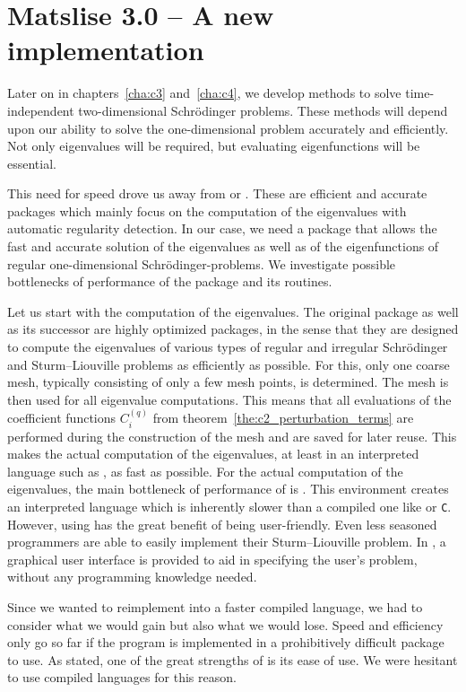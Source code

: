 \section{Matslise 3.0 -- A new implementation}\label{sec:c2_the_implementation}

Later on in chapters~\ref{cha:c3} and~\ref{cha:c4}, we develop methods to solve time-independent two-dimensional Schrödinger problems. These methods will depend upon our ability to solve the one-dimensional problem accurately and efficiently. Not only eigenvalues will be required, but evaluating eigenfunctions will be essential.

This need for speed drove us away from \matslise{} or . These are efficient and accurate packages which mainly focus on the computation of the eigenvalues with automatic regularity detection. In our case, we need a package that allows the fast and accurate solution of the eigenvalues as well as of the eigenfunctions of regular one-dimensional Schrödinger-problems. We investigate possible bottlenecks of performance of the  package and its routines.

Let us start with the computation of the eigenvalues. The original \matslise{} package as well as its successor  are highly optimized packages, in the sense that they are designed to compute the eigenvalues of various types of regular and irregular Schrödinger and Sturm--Liouville problems as efficiently as possible. For this, only one coarse mesh, typically consisting of only a few mesh points, is determined. The mesh is then used for all eigenvalue computations. This means that all evaluations of the coefficient functions $C_i^{(q)}$ from theorem~\ref{the:c2_perturbation_terms} are performed during the construction of the mesh and are saved for later reuse. This makes the actual computation of the eigenvalues, at least in an interpreted language such as \matlab{}, as fast as possible. For the actual computation of the eigenvalues, the main bottleneck of performance of  is \matlab{}. This environment creates an interpreted language which is inherently slower than a compiled one like \fortran{} or \texttt{C}. However, using \matlab{} has the great benefit of being user-friendly. Even less seasoned programmers are able to easily implement their Sturm--Liouville problem. In , a graphical user interface is provided to aid in specifying the user's problem, without any programming knowledge needed.

Since we wanted to reimplement \matslise{} into a faster compiled language, we had to consider what we would gain but also what we would lose. Speed and efficiency only go so far if the program is implemented in a prohibitively difficult package to use. As stated, one of the great strengths of  is its ease of use. We were hesitant to use compiled languages for this reason.

